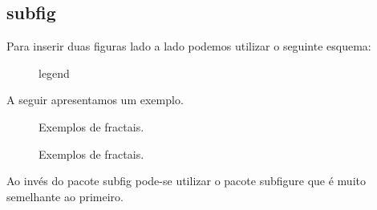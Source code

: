 \subsection{\textsf{subfig}}

Para inserir duas figuras lado a lado podemos utilizar o seguinte esquema:
\begin{latexcode}
    \begin{figure}[place]
        \centering
        \caption{legend}
        \label{P:imagem}
    \end{figure}
\end{latexcode}

A seguir apresentamos um exemplo.
\begin{latexcode}
    \begin{figure}[h!]
        \centering
         \hspace{0.5cm}
        \caption{Exemplos de fractais.}
        \label{F:fractais}
    \end{figure}
\end{latexcode}
\begin{figure}[h!]
    \centering
     \hspace{0.5cm}
    \caption{Exemplos de fractais.}
    \label{F:fractais}
\end{figure}

Ao invés do pacote \textsf{subfig} pode-se utilizar o pacote \textsf{subfigure} que é muito semelhante ao primeiro.
